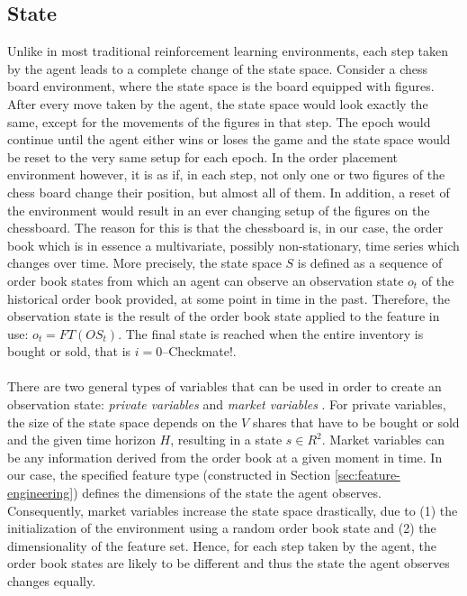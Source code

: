 \subsection{State}
\label{setup:state}
Unlike in most traditional reinforcement learning environments, each step taken by the agent leads to a complete change of the state space.
Consider a chess board environment, where the state space is the board equipped with figures. 
After every move taken by the agent, the state space would look exactly the same, except for the movements of the figures in that step.
The epoch would continue until the agent either wins or loses the game and the state space would be reset to the very same setup for each epoch.
In the order placement environment however, it is as if, in each step, not only one or two figures of the chess board change their position, but almost all of them.
In addition, a reset of the environment would result in an ever changing setup of the figures on the chessboard.
The reason for this is that the chessboard is, in our case, the order book which is in essence a multivariate, possibly non-stationary, time series which changes over time.
More precisely, the state space $S$ is defined as a sequence of order book states from which an agent can observe an observation state $o_t$ of the historical order book provided, at some point in time in the past.
Therefore, the observation state is the result of the order book state applied to the feature in use: $o_t = FT(OS_t)$.
The final state is reached when the entire inventory is bought or sold, that is $i=0$--Checkmate!.
\\
\\
There are two general types of variables that can be used in order to create an observation state: \textit{private variables} and \textit{market variables} \cite{nevmyvaka2006reinforcement}.
For private variables, the size of the state space depends on the $V$ shares that have to be bought or sold and the given time horizon $H$, resulting in a state $s \in R^2$.
Market variables can be any information derived from the order book at a given moment in time.
In our case, the specified feature type (constructed in Section \ref{sec:feature-engineering}) defines the dimensions of the state the agent observes.
Consequently, market variables increase the state space drastically, due to (1) the initialization of the environment using a random order book state and (2) the dimensionality of the feature set.
Hence, for each step taken by the agent, the order book states are likely to be different and thus the state the agent observes changes equally. 

